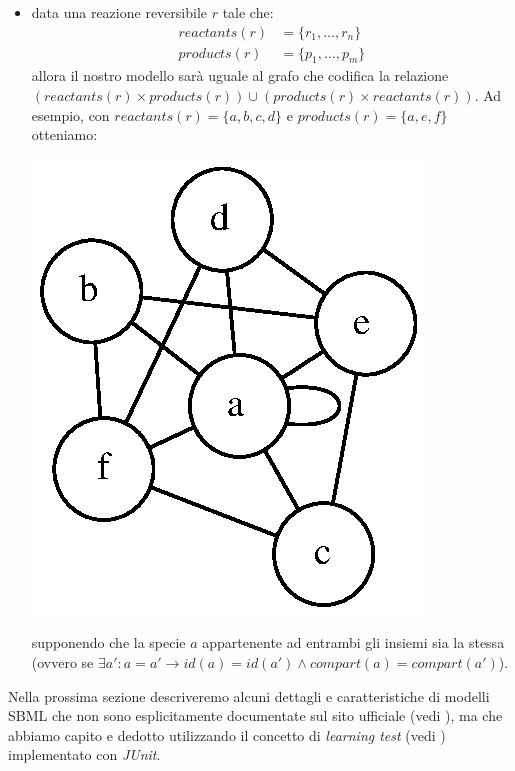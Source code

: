 \begin{itemize}
\item data una reazione reversibile $r$ tale che:
  \begin{displaymath}
    \begin{split} 
      reactants(r) &= \{ r_{1}, \ldots, r_{n} \} \\
      products(r) &= \{ p_{1}, \ldots, p_{m} \}
    \end{split}
  \end{displaymath}
  allora il nostro modello sar\`a uguale al grafo che codifica la
  relazione $(reactants(r) \times products(r)) \cup (products(r)
  \times reactants(r))$. Ad esempio, con $reactants(r) = \{ a, b, c, d
  \}$ e $products(r) = \{a, e, f\}$ otteniamo:

\begin{center}
\includegraphics{images/reversible-reaction-example.dot.eps}
\end{center}
supponendo che la specie $a$ appartenente ad entrambi gli
insiemi sia la stessa (ovvero se $\exists a': a = a' \rightarrow id(a) =
id(a') \wedge compart(a) = compart(a')$).

\end{itemize}

Nella prossima sezione descriveremo alcuni dettagli e caratteristiche
di modelli SBML che non sono esplicitamente documentate sul sito
ufficiale (vedi \cite{sbmlOfficialDocumentation}), ma che abbiamo
capito e dedotto utilizzando il concetto di \emph{learning test} (vedi
\cite[p. 136]{beck2003}) implementato con \emph{JUnit}.

